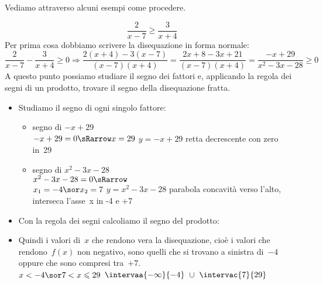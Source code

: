 Vediamo attraverso alcuni esempi come procedere.

\begin{esempio}
 \[\frac{2}{x-7} \geqslant \frac{3}{x+4}\]
Per prima cosa dobbiamo scrivere la disequazione in forma normale:
 \[\frac{2}{x-7} - \frac{3}{x+4} \geqslant 0 \Rightarrow 
   \frac{2(x+4) - 3(x-7)}{(x-7)(x+4)} = 
   \frac{2 x +8 -3x +21}{(x-7)(x+4)} =
   \frac{-x +29}{x^2-3x-28} \geqslant 0\]
A questo punto possiamo studiare il segno dei fattori e, applicando la regola 
dei segni di un prodotto, trovare il segno della disequazione fratta.

\begin{itemize}
 \item Studiamo il segno di ogni singolo fattore:

\begin{itemize}

 \item  segno di \(-x +29\)\\
 \segnofatt
   {\(-x +29=0 \sRarrow x=29\)}
   {\(y=-x +29\)}
   {retta decrescente con zero in~29}
   {}
 \item segno di \(x^2-3x-28\)\\
 \segnofatt
   {\(x^2-3x-28=0 \sRarrow \) \\
  \(x_1=-4 \sor x_2=7\)}
   {\(y=x^2-3x-28\)}
   {parabola concavità verso l'alto, interseca l'asse~x in -4 e +7}
   {}
\end{itemize}
 \item Con la regola dei segni calcoliamo il segno del prodotto:
\begin{inaccessibleblock}
  \begin{center}
  \segnofrazionea
  \end{center}
\end{inaccessibleblock}
 \item 
 Quindi i valori di~\(x\) che rendono vera la disequazione, cioè 
i valori  che rendono~\(f(x)\) non negativo, sono quelli 
  che si trovano a sinistra di~\(-4\) oppure che sono compresi 
  tra~\(+7\).\\
 \insiemesoluzione
   {\solfrazionea}
   {\(x < -4 \sor 7 < x \leqslant 29\)}
   {\(\intervaa{-\infty}{-4}~\cup~\intervac{7}{29}\)}
\end{itemize}
\end{esempio}

